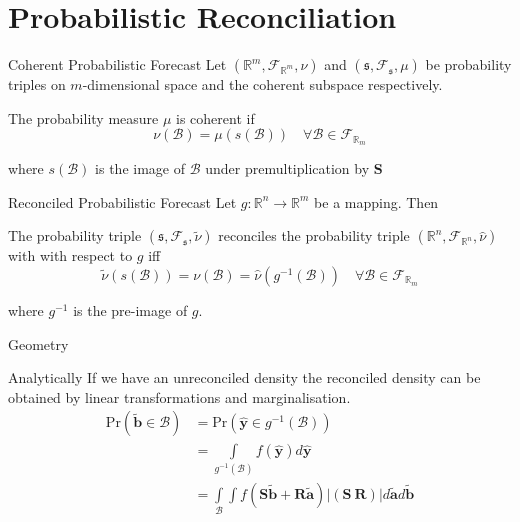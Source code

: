 \documentclass[handout]{beamer}
\begin{document}
  \section{Probabilistic Reconciliation}
  \begin{frame}{Coherent Probabilistic Forecast}
    Let $(\mathbb{R}^m,\mathcal{F}_{\mathbb{R}^m},\nu)$ and $(\mathfrak{s},\mathcal{F}_{\mathfrak{s}},\mu)$ be probability triples on $m$-dimensional space and the coherent subspace respectively.
    \begin{definition}
      The probability measure $\mu$ is coherent if
      \begin{equation*}
      \nu(\mathcal{B})=\mu(s(\mathcal{B}))\quad\forall\mathcal{B}\in \mathcal{F}_{\mathbb{R}_m}
      \end{equation*} 
    \end{definition}
    where $s(\mathcal{B})$ is the image of $\mathcal{B}$ under premultiplication by ${\bm S}$
  \end{frame}
  \begin{frame}{Reconciled Probabilistic Forecast}
  	Let $g:\mathbb{R}^n\rightarrow\mathbb{R}^m$ be a mapping.  Then 
  	\begin{definition}
  	The probability triple $\left(\mathfrak{s},\mathcal{F}_{\mathfrak{s}},\tilde{\nu}\right)$ reconciles the probability triple $\left(\mathbb{R}^n,\mathcal{F}_{\mathbb{R}^n},\hat{\nu}\right)$ with with respect to $g$ iff
  	\begin{equation*}
  	\tilde{\nu}(s(\mathcal{B}))=\nu(\mathcal{B})=\hat{\nu}(g^{-1}(\mathcal{B}))\quad\forall \mathcal{B}\in\mathcal{F}_{\mathbb{R}_m}
  	\end{equation*}
  	\end{definition}
    where $g^{-1}$ is the pre-image of $g$.
  \end{frame}
  \begin{frame}{Geometry}
  	\centering
  	
  \end{frame}
  \begin{frame}{Analytically}
  	If we have an unreconciled density the reconciled density can be obtained by linear transformations and marginalisation.
  	\begin{align*}
  	\mbox{Pr}(\tilde{\bm{b}}\in \mathcal{B})&=\mbox{Pr}(\hat{\bm{y}}\in g^{-1}(\mathcal{B}))\\
  	&=\int\limits_{g^{-1}(\mathcal{B})}f(\hat{\bm{y}})d\hat{\bm{y}}\\
  	&=\int\limits_{\mathcal{B}}\int f(\bm{S}\tilde{\bm{b}}+\bm{R}\tilde{\bm{a}})|\left(\bm{S}~\bm{R}\right)|d\tilde{\bm{a}}d\tilde{\bm{b}}
  	\end{align*}
  \end{frame}
\end{document}
